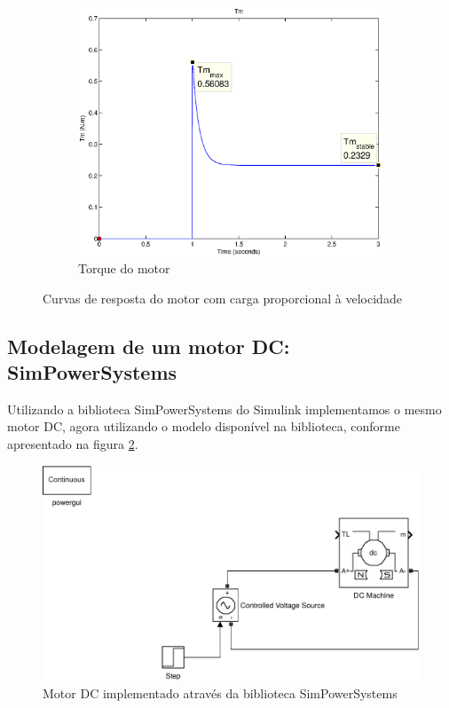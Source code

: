 \documentclass{article}
\begin{document}
\begin{figure}[H]
\begin{subfigure}[b]{0.49\linewidth}
		\centering
		\includegraphics[width=\linewidth]{matlab/tm2}
		\caption{Torque do motor}
	\end{subfigure}
	\caption{Curvas de resposta do motor com carga proporcional à velocidade}
	\label{fig:res2}
\end{figure}

\subsection{Modelagem de um motor DC: SimPowerSystems}
Utilizando a biblioteca SimPowerSystems do Simulink implementamos o mesmo motor DC, agora utilizando o modelo disponível na biblioteca, conforme apresentado na figura \ref{fig:sim2}.
\begin{figure}[H]
	\centering
	\includegraphics[width=\linewidth]{matlab/sim2}
	\caption{Motor DC implementado através da biblioteca SimPowerSystems}
	\label{fig:sim2}
\end{figure}
\end{document}
